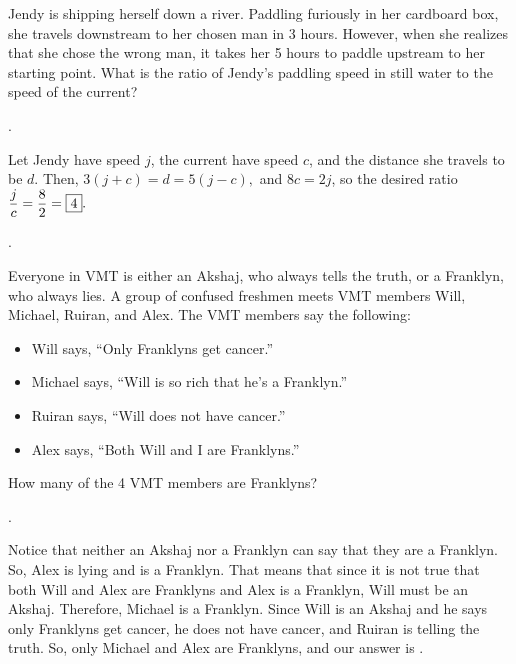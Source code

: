 \documentclass[11pt]{article}
\DeclareRobustCommand{\frac}[3][0pt]{%
  {\begingroup\hspace{#1}#2\hspace{#1}\endgroup\over\hspace{#1}#3\hspace{#1}}}
\begin{document}

\begin{problem}
\end{problem}

\begin{problem}
\end{problem}

\begin{problem}
\end{problem}

\begin{problem}
\end{problem}


\begin{problem}Jendy is shipping herself down a river. Paddling furiously in her cardboard box, she travels downstream to her chosen man in 3 hours. However, when she realizes that she chose the wrong man, it takes her 5 hours to paddle upstream to her starting point. What is the ratio of Jendy’s paddling speed in still water to the speed of the current?
\end{problem}

.
\begin{solution}
Let Jendy have speed $j$, the current have speed $c$, and the distance she travels to be $d$. Then, $3(j + c) = d = 5(j- c),$ and $8c = 2j$, so the desired ratio $\displaystyle \frac{j}{c} = \frac{8}{2} = \boxed{4}.$
\end{solution}.

\begin{problem}
Everyone in VMT is either an Akshaj, who always tells the truth, or a Franklyn, who always lies. A group of confused freshmen meets VMT members Will, Michael, Ruiran, and Alex. The VMT members say the following:
    \begin{itemize}
        \item Will says, ``Only Franklyns get cancer.''
        \item Michael says, ``Will is so rich that he's a Franklyn.''
        \item Ruiran says, ``Will does not have cancer.''
        \item Alex says, ``Both Will and I are Franklyns.''
    \end{itemize}
    How many of the 4 VMT members are Franklyns?
\end{problem}

.
\begin{solution}
Notice that neither an Akshaj nor a Franklyn can say that they are a Franklyn. So, Alex is lying and is a Franklyn. That means that since it is not true that both Will and Alex are Franklyns and Alex is a Franklyn, Will must be an Akshaj. Therefore, Michael is a Franklyn. Since Will is an Akshaj and he says only Franklyns get cancer, he does not have cancer, and Ruiran is telling the truth. So, only Michael and Alex are Franklyns, and our answer is .
\end{solution}
\end{document}
